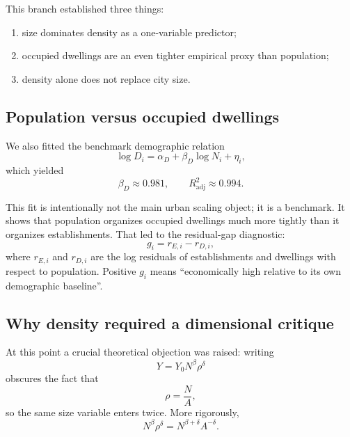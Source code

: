 \documentclass[11pt]{article}
\newcommand{\adjR}{R^2_{\mathrm{adj}}}
\begin{document}
This branch established three things:
\begin{enumerate}[label=\arabic*.,leftmargin=2.0em]
\item size dominates density as a one-variable predictor;
\item occupied dwellings are an even tighter empirical proxy than population;
\item density alone does not replace city size.
\end{enumerate}

\subsection{Population versus occupied dwellings}

We also fitted the benchmark demographic relation
\begin{equation}
\log D_i = \alpha_D + \beta_D \log N_i + \eta_i,
\end{equation}
which yielded
\begin{equation}
\beta_D \approx 0.981,
\qquad
\adjR \approx 0.994.
\end{equation}

This fit is intentionally not the main urban scaling object; it is a benchmark. It shows that population organizes occupied dwellings much more tightly than it organizes establishments. That led to the residual-gap diagnostic:
\begin{equation}
g_i = r_{E,i} - r_{D,i},
\end{equation}
where \(r_{E,i}\) and \(r_{D,i}\) are the log residuals of establishments and dwellings with respect to population. Positive \(g_i\) means ``economically high relative to its own demographic baseline''.

\subsection{Why density required a dimensional critique}

At this point a crucial theoretical objection was raised: writing
\begin{equation}
Y = Y_0 N^\beta \rho^\delta
\end{equation}
obscures the fact that
\begin{equation}
\rho = \frac{N}{A},
\end{equation}
so the same size variable enters twice. More rigorously,
\begin{equation}
N^\beta \rho^\delta = N^{\beta+\delta} A^{-\delta}.
\end{equation}
\end{document}
